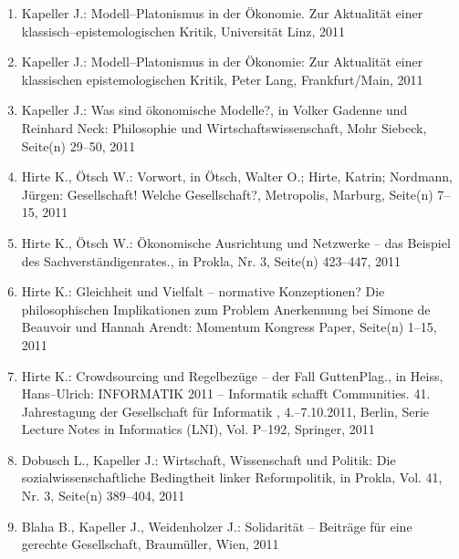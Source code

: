 \begin{enumerate}
	 \item Kapeller J.: Modell--Platonismus in der Ökonomie. Zur Aktualität einer klassisch--epistemologischen Kritik, Universität Linz, 2011
	 \item Kapeller J.: Modell--Platonismus in der Ökonomie: Zur Aktualität einer klassischen epistemologischen Kritik, Peter Lang, Frankfurt/Main, 2011
	 \item Kapeller J.: Was sind ökonomische Modelle?, in Volker Gadenne und Reinhard Neck: Philosophie und Wirtschaftswissenschaft, Mohr Siebeck, Seite(n) 29--50, 2011
	 \item Hirte K., Ötsch W.: Vorwort, in Ötsch, Walter O.; Hirte, Katrin; Nordmann, Jürgen: Gesellschaft! Welche Gesellschaft?, Metropolis, Marburg, Seite(n) 7--15, 2011
	 \item Hirte K., Ötsch W.: Ökonomische Ausrichtung und Netzwerke -- das Beispiel des Sachverständigenrates., in Prokla, Nr. 3, Seite(n) 423--447, 2011
	 \item Hirte K.: Gleichheit und Vielfalt – normative Konzeptionen? Die philosophischen Implikationen zum Problem Anerkennung bei Simone de Beauvoir und Hannah Arendt: Momentum Kongress Paper, Seite(n) 1--15, 2011
	 \item Hirte K.: Crowdsourcing und Regelbezüge -- der Fall GuttenPlag., in Heiss, Hans--Ulrich: INFORMATIK 2011 -- Informatik schafft Communities. 41. Jahrestagung der Gesellschaft für Informatik , 4.--7.10.2011, Berlin, Serie Lecture Notes in Informatics (LNI), Vol. P--192, Springer, 2011
	 \item Dobusch L., Kapeller J.: Wirtschaft, Wissenschaft und Politik: Die sozialwissenschaftliche Bedingtheit linker Reformpolitik, in Prokla, Vol. 41, Nr. 3, Seite(n) 389--404, 2011
	 \item Blaha B., Kapeller J., Weidenholzer J.: Solidarität -- Beiträge für eine gerechte Gesellschaft, Braumüller, Wien, 2011
\end{enumerate}
